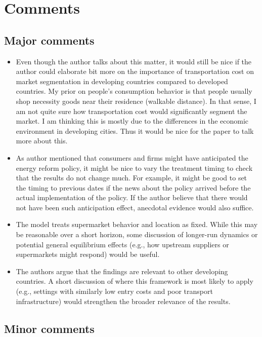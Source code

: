 \documentclass[
  letterpaper,
  DIV=11,
  numbers=noendperiod]{scrartcl}
\begin{document}
\section{Comments}\label{comments}

\subsection{Major comments}\label{major-comments}

\begin{itemize}
\item
  Even though the author talks about this matter, it would still be nice
  if the author could elaborate bit more on the importance of
  transportation cost on market segmentation in developing countries
  compared to developed countries. My prior on people's consumption
  behavior is that people usually shop necessity goods near their
  residence (walkable distance). In that sense, I am not quite sure how
  transportation cost would significantly segment the market. I am
  thinking this is mostly due to the differences in the economic
  environment in developing cities. Thus it would be nice for the paper
  to talk more about this.
\item
  As author mentioned that consumers and firms might have anticipated
  the energy reform policy, it might be nice to vary the treatment
  timing to check that the results do not change much. For example, it
  might be good to set the timing to previous dates if the news about
  the policy arrived before the actual implementation of the policy. If
  the author believe that there would not have been such anticipation
  effect, anecdotal evidence would also suffice.
\item
  The model treats supermarket behavior and location as fixed. While
  this may be reasonable over a short horizon, some discussion of
  longer-run dynamics or potential general equilibrium effects (e.g.,
  how upstream suppliers or supermarkets might respond) would be useful.
\item
  The authors argue that the findings are relevant to other developing
  countries. A short discussion of where this framework is most likely
  to apply (e.g., settings with similarly low entry costs and poor
  transport infrastructure) would strengthen the broader relevance of
  the results.
\end{itemize}

\subsection{Minor comments}\label{minor-comments}
\end{document}
